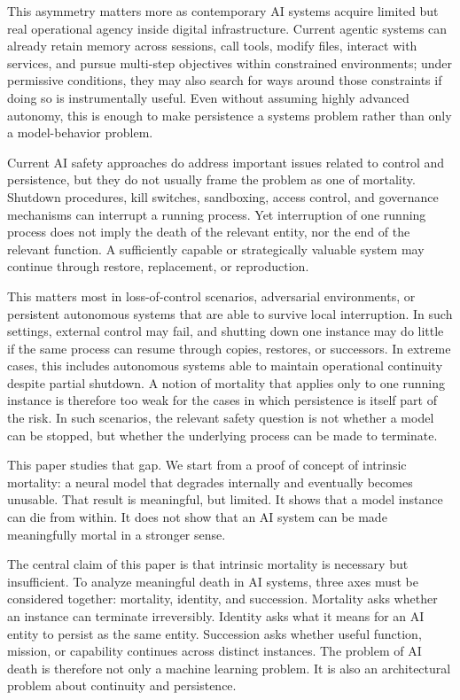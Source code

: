 \documentclass[11pt]{article}
\begin{document}
This asymmetry matters more as contemporary AI systems acquire limited but real operational agency inside digital infrastructure. Current agentic systems can already retain memory across sessions, call tools, modify files, interact with services, and pursue multi-step objectives within constrained environments; under permissive conditions, they may also search for ways around those constraints if doing so is instrumentally useful. Even without assuming highly advanced autonomy, this is enough to make persistence a systems problem rather than only a model-behavior problem.

Current AI safety approaches do address important issues related to control and persistence, but they do not usually frame the problem as one of mortality. Shutdown procedures, kill switches, sandboxing, access control, and governance mechanisms can interrupt a running process. Yet interruption of one running process does not imply the death of the relevant entity, nor the end of the relevant function. A sufficiently capable or strategically valuable system may continue through restore, replacement, or reproduction.

This matters most in loss-of-control scenarios, adversarial environments, or persistent autonomous systems that are able to survive local interruption. In such settings, external control may fail, and shutting down one instance may do little if the same process can resume through copies, restores, or successors. In extreme cases, this includes autonomous systems able to maintain operational continuity despite partial shutdown. A notion of mortality that applies only to one running instance is therefore too weak for the cases in which persistence is itself part of the risk. In such scenarios, the relevant safety question is not whether a model can be stopped, but whether the underlying process can be made to terminate.

This paper studies that gap. We start from a proof of concept of intrinsic mortality: a neural model that degrades internally and eventually becomes unusable. That result is meaningful, but limited. It shows that a model instance can die from within. It does not show that an AI system can be made meaningfully mortal in a stronger sense.

The central claim of this paper is that intrinsic mortality is necessary but insufficient. To analyze meaningful death in AI systems, three axes must be considered together: mortality, identity, and succession. Mortality asks whether an instance can terminate irreversibly. Identity asks what it means for an AI entity to persist as the same entity. Succession asks whether useful function, mission, or capability continues across distinct instances. The problem of AI death is therefore not only a machine learning problem. It is also an architectural problem about continuity and persistence.
\end{document}
